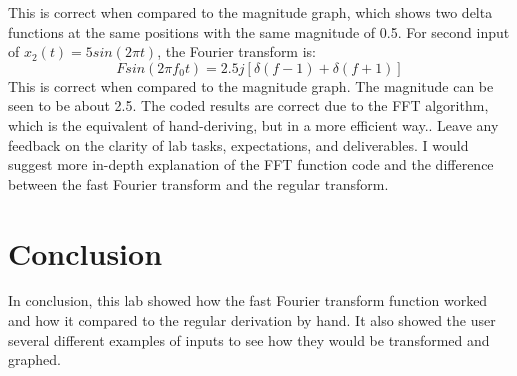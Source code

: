 \documentclass[12pt]{article}
\begin{document}
This is correct when compared to the magnitude graph, which shows two delta functions at the same positions with the same magnitude of 0.5.\newline
For second input of $x_2(t) = 5sin(2\pi t)$, the Fourier transform is:
\[F {sin (2\pi f_0t)} =2.5j[\delta (f − 1) + \delta (f + 1)]\]
This is correct when compared to the magnitude graph. The magnitude can be seen to be about 2.5.
\newline
The coded results are correct due to the FFT algorithm, which is the equivalent of hand-deriving, but in a more efficient way.. Leave any feedback on the clarity of lab tasks, expectations, and deliverables. \newline
I would suggest more in-depth explanation of the FFT function code and the difference between the fast Fourier transform and the regular transform.\newline


\section{Conclusion}
In conclusion, this lab showed how the fast Fourier transform function worked and how it compared to the regular derivation by hand. It also showed the user several different examples of inputs to see how they would be transformed and graphed.
\end{document}
